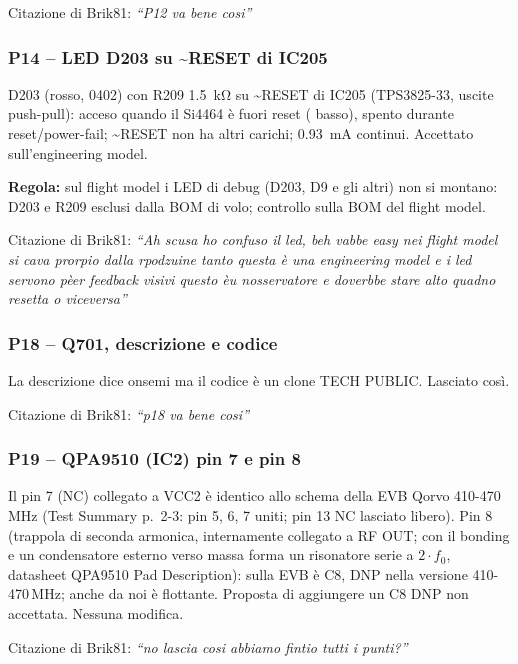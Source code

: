 Citazione di Brik81: \emph{``P12 va bene cosi''}

\subsubsection{P14 -- LED D203 su \textasciitilde{}RESET di IC205}
D203 (rosso, 0402) con R209 \SI{1.5}{\kilo\ohm} su \textasciitilde{}RESET di IC205 (TPS3825-33, uscite push-pull): acceso quando il Si4464 è fuori reset ( basso), spento durante reset/power-fail; \textasciitilde{}RESET non ha altri carichi; \SI{0.93}{\milli\ampere} continui. Accettato sull'engineering model.

\begin{notebox}
\textbf{Regola:} sul flight model i LED di debug (D203, D9 e gli altri) non si montano: D203 e R209 esclusi dalla BOM di volo; controllo sulla BOM del flight model.
\end{notebox}

Citazione di Brik81: \emph{``Ah scusa ho confuso il led, beh vabbe easy nei flight model si cava prorpio dalla rpodzuine tanto questa è una engineering model e i led servono pèer feedback visivi questo  èu nosservatore e doverbbe stare alto quadno resetta o viceversa''}

\subsubsection{P18 -- Q701, descrizione e codice}
La descrizione dice onsemi ma il codice è un clone TECH PUBLIC. Lasciato così.

Citazione di Brik81: \emph{``p18 va bene cosi''}

\subsubsection{P19 -- QPA9510 (IC2) pin 7 e pin 8}
Il pin 7 (NC) collegato a VCC2 è identico allo schema della EVB Qorvo 410-470\,MHz (Test Summary p.\ 2-3: pin 5, 6, 7 uniti; pin 13 NC lasciato libero). Pin 8  (trappola di seconda armonica, internamente collegato a RF OUT; con il bonding e un condensatore esterno verso massa forma un risonatore serie a $2\cdot f_0$, datasheet QPA9510 Pad Description): sulla EVB è C8, DNP nella versione 410-470\,MHz; anche da noi è flottante. Proposta di aggiungere un C8 DNP non accettata. Nessuna modifica.

Citazione di Brik81: \emph{``no lascia cosi abbiamo fintio tutti i punti?''}

